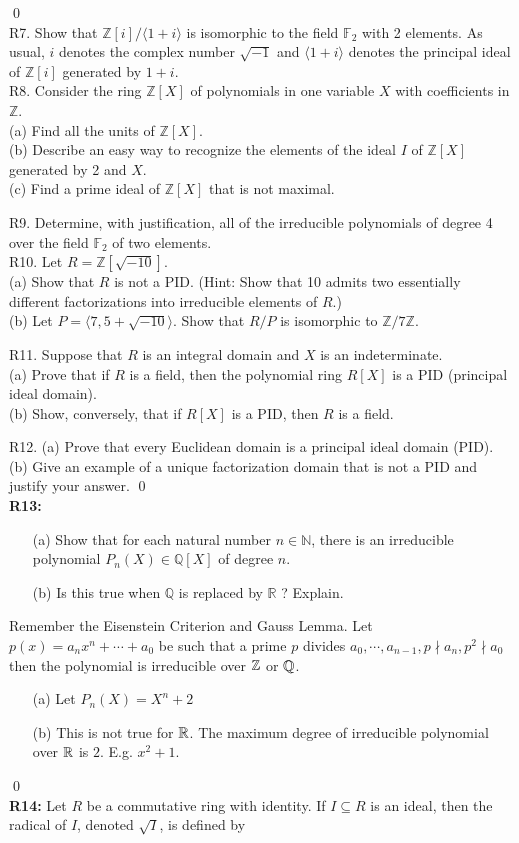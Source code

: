 \qed\\
R7. Show that $\mathbb{Z}[i] /\langle 1+i\rangle$ is isomorphic to the field $\mathbb{F}_{2}$ with 2 elements. As usual, $i$ denotes the complex number $\sqrt{-1}$ and $\langle 1+i\rangle$ denotes the principal ideal of $\mathbb{Z}[i]$ generated by $1+i$.\\
R8. Consider the ring $\mathbb{Z}[X]$ of polynomials in one variable $X$ with coefficients in $\mathbb{Z}$.\\
(a) Find all the units of $\mathbb{Z}[X]$.\\
(b) Describe an easy way to recognize the elements of the ideal $I$ of $\mathbb{Z}[X]$ generated by 2 and $X$.\\
(c) Find a prime ideal of $\mathbb{Z}[X]$ that is not maximal.

R9. Determine, with justification, all of the irreducible polynomials of degree 4 over the field $\mathbb{F}_{2}$ of two elements.\\
R10. Let $R=\mathbb{Z}[\sqrt{-10}]$.\\
(a) Show that $R$ is not a PID. (Hint: Show that 10 admits two essentially different factorizations into irreducible elements of $R$.)\\
(b) Let $P=\langle 7,5+\sqrt{-10}\rangle$. Show that $R / P$ is isomorphic to $\mathbb{Z} / 7 \mathbb{Z}$.

R11. Suppose that $R$ is an integral domain and $X$ is an indeterminate.\\
(a) Prove that if $R$ is a field, then the polynomial ring $R[X]$ is a PID (principal ideal domain).\\
(b) Show, conversely, that if $R[X]$ is a PID, then $R$ is a field.

R12. (a) Prove that every Euclidean domain is a principal ideal domain (PID).\\
(b) Give an example of a unique factorization domain that is not a PID and justify your answer.
\soln
\qed\\
\textbf{R13:}
\begin{itemize}
	\item[(a)] Show that for each natural number $n \in \mathbb{N}$, there is an irreducible polynomial $P_{n}(X) \in \mathbb{Q}[X]$ of degree $n$.\\
	\item[(b)] Is this true when $\mathbb{Q}$ is replaced by $\mathbb{R}$ ? Explain. 
\end{itemize} 
\soln Remember the Eisenstein Criterion and Gauss Lemma. Let $ p(x)=a_nx^n +\cdots +a_0 $ be such that a prime $ p $ divides $ a_0,\cdots, a_{n-1}, p\nmid a_n, p^2\nmid a_0 $ then the polynomial is irreducible over $ \mathbb{Z} $ or $ \mathbb{Q} $.
\begin{itemize}
	\item[(a)] Let $ P_n(X)= X^n + 2 $
	\item[(b)] This is not true for $ \mathbb{R} $. The maximum degree of irreducible polynomial over $ \mathbb{R} $ is $ 2 $. E.g. $ x^2+1 $.
\end{itemize}
\qed\\
\textbf{R14:} Let $R$ be a commutative ring with identity. If $I \subseteq R$ is an ideal, then the radical of $I$, denoted $\sqrt{I}$, is defined by

